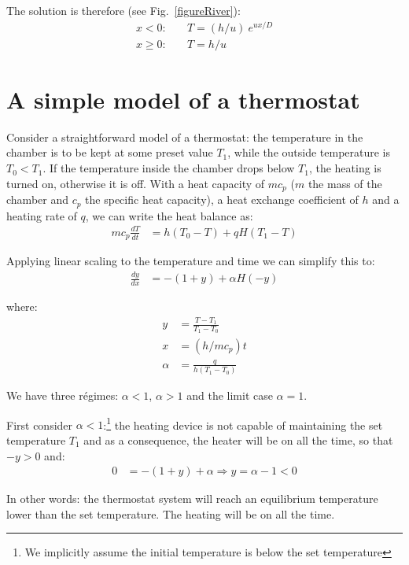 \documentclass[onecolumn]{article}
\begin{document}
The solution is therefore (see Fig.\ \ref{figureRiver}):
%
\begin{align}
          x < 0:    & \quad T = (h/u) \  e^{u x / D} \\
\nonumber x \geq 0: & \quad T = h/u
\end{align}


\section*{A simple model of a thermostat}
Consider a straightforward model of a thermostat: the temperature in the chamber is to be kept at
some preset value $T_1$, while the outside temperature is $T_0 < T_1$. If the temperature inside the chamber
drops below $T_1$, the heating is turned on, otherwise it is off. With a heat capacity of $mc_p$
($m$ the mass of the chamber and $c_p$ the specific heat capacity), a heat exchange coefficient of $h$
and a heating rate of $q$, we can write the heat balance as:
%
\begin{align}
    m c_p \frac{dT}{dt} &= h (T_0 - T) + q H(T_1-T)
\end{align}

Applying linear scaling to the temperature and time we can simplify this to:
%
\begin{align}
    \frac{dy}{dx} &= -(1+y) + \alpha H(-y)
\end{align}

\noindent where:
%
\begin{align}
    y      &= \frac{T - T_1}{T_1 - T_0} \\
    x      &= (h/m c_p) t \\
    \alpha &= \frac{q}{h(T_1-T_0)}
\end{align}

We have three r\'egimes: $\alpha < 1$, $\alpha > 1$ and the limit case $\alpha = 1$.

First consider $\alpha < 1$:\footnote{We implicitly assume the initial temperature is below the set temperature}
the heating device is not capable of maintaining the set temperature
$T_1$ and as a consequence, the heater will be on all the time, so that $-y > 0$ and:
%
\begin{align}
    0 &= -(1 + y) + \alpha \Rightarrow y = \alpha - 1 < 0
\end{align}

In other words: the thermostat system will reach an equilibrium temperature lower than the set temperature.
The heating will be on all the time.
\end{document}

